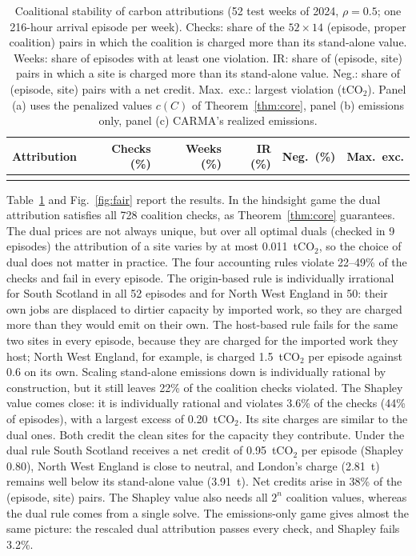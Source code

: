 \begin{table}[!htbp]
\centering
\caption{Coalitional stability of carbon attributions (52 test weeks of 2024, $\rho=0.5$; one 216-hour arrival episode per week). Checks: share of the $52\times14$ (episode, proper coalition) pairs in which the coalition is charged more than its stand-alone value. Weeks: share of episodes with at least one violation. IR: share of (episode, site) pairs in which a site is charged more than its stand-alone value. Neg.: share of (episode, site) pairs with a net credit. Max.\ exc.: largest violation (tCO$_2$). Panel (a) uses the penalized values $c(C)$ of Theorem~\ref{thm:core}, panel (b) emissions only, panel (c) CARMA's realized emissions.}
\label{tab:fair}
\footnotesize\setlength{\tabcolsep}{4pt}
\begin{tabular}{lrrrrr}
\toprule
Attribution & Checks (\%) & Weeks (\%) & IR (\%) & Neg.\ (\%) & Max.\ exc. \\
\midrule
{}{table_fair.tex}
\bottomrule
\end{tabular}
\end{table}

Table~\ref{tab:fair} and Fig.~\ref{fig:fair} report the results. In the hindsight game the dual attribution satisfies all 728 coalition checks, as Theorem~\ref{thm:core} guarantees. The dual prices are not always unique, but over all optimal duals (checked in 9 episodes) the attribution of a site varies by at most 0.011~tCO$_2$, so the choice of dual does not matter in practice. The four accounting rules violate 22--49\% of the checks and fail in every episode. The origin-based rule is individually irrational for South Scotland in all 52 episodes and for North West England in 50: their own jobs are displaced to dirtier capacity by imported work, so they are charged more than they would emit on their own. The host-based rule fails for the same two sites in every episode, because they are charged for the imported work they host; North West England, for example, is charged 1.5~tCO$_2$ per episode against 0.6 on its own. Scaling stand-alone emissions down is individually rational by construction, but it still leaves 22\% of the coalition checks violated. The Shapley value comes close: it is individually rational and violates 3.6\% of the checks (44\% of episodes), with a largest excess of 0.20~tCO$_2$. Its site charges are similar to the dual ones. Both credit the clean sites for the capacity they contribute. Under the dual rule South Scotland receives a net credit of 0.95~tCO$_2$ per episode (Shapley 0.80), North West England is close to neutral, and London's charge (2.81~t) remains well below its stand-alone value (3.91~t). Net credits arise in 38\% of the (episode, site) pairs. The Shapley value also needs all $2^n$ coalition values, whereas the dual rule comes from a single solve. The emissions-only game gives almost the same picture: the rescaled dual attribution passes every check, and Shapley fails 3.2\%.

